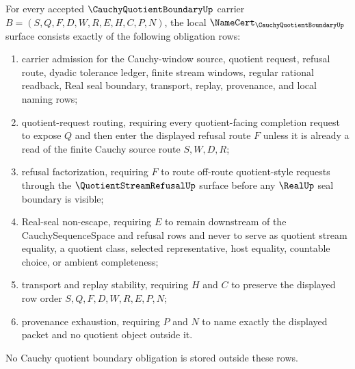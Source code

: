
\begin{theorem}\label{thm:cauchy-quotient-boundary-namecert-obligations}
For every accepted $\CauchyQuotientBoundaryUp$ carrier $B=(S,Q,F,D,W,R,E,H,C,P,N)$, the local $\NameCert_{\CauchyQuotientBoundaryUp}$ surface consists exactly of the following obligation rows:
\begin{enumerate}
\item carrier admission for the Cauchy-window source, quotient request, refusal route, dyadic tolerance ledger, finite stream windows, regular rational readback, Real seal boundary, transport, replay, provenance, and local naming rows;
\item quotient-request routing, requiring every quotient-facing completion request to expose $Q$ and then enter the displayed refusal route $F$ unless it is already a read of the finite Cauchy source route $S,W,D,R$;
\item refusal factorization, requiring $F$ to route off-route quotient-style requests through the $\QuotientStreamRefusalUp$ surface before any $\RealUp$ seal boundary is visible;
\item Real-seal non-escape, requiring $E$ to remain downstream of the CauchySequenceSpace and refusal rows and never to serve as quotient stream equality, a quotient class, selected representative, host equality, countable choice, or ambient completeness;
\item transport and replay stability, requiring $H$ and $C$ to preserve the displayed row order $S,Q,F,D,W,R,E,P,N$;
\item provenance exhaustion, requiring $P$ and $N$ to name exactly the displayed packet and no quotient object outside it.
\end{enumerate}
No Cauchy quotient boundary obligation is stored outside these rows.
\end{theorem}
